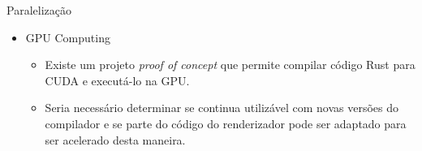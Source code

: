 \documentclass{beamer}
\begin{document}
\begin{frame}{Paralelização}
	\begin{itemize}
		\item GPU Computing
		\begin{itemize}
			\item Existe um projeto \emph{proof of concept} que permite compilar código Rust para CUDA e executá-lo na GPU.
			\item Seria necessário determinar se continua utilizável com novas versões do compilador e se parte do código do renderizador pode ser adaptado para ser acelerado desta maneira.
		\end{itemize}
	\end{itemize}
\end{frame}

\begin{frame}
\titlepage
\end{frame}
\end{document}
